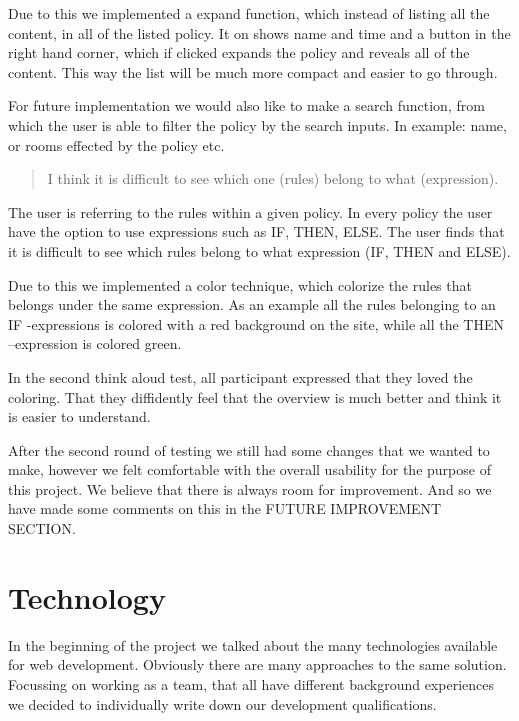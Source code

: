 Due to this we implemented a expand function, which instead of listing all the content, in all of the listed policy. It on shows name and time and a button in the right hand corner, which if clicked expands the policy and reveals all of the content. This way the list will be much more compact and easier to go through. 

For future implementation we would also like to make a search function, from which the user is able to filter the policy by the search inputs. In example: name, or rooms effected  by the policy etc.
 
\begin{quotation}
I think it is difficult to see which one (rules) belong to what (expression).
\end{quotation}

The user is referring to the rules within a given policy. In every policy the user have the option to use expressions such as IF, THEN, ELSE. The user finds that it is difficult to see which rules belong to what expression (IF, THEN and ELSE).

Due to this we implemented a color technique, which colorize the rules that belongs under the same expression. As an example all the rules belonging to an IF -expressions is colored with a red background on the site, while all the THEN –expression is colored green.

In the second think aloud test, all participant expressed that they loved the coloring. That they diffidently feel that the overview is much better and think it is easier to understand.


After the second round of testing we still had some changes that we wanted to make, however we felt comfortable with the overall usability for the purpose of this project. We believe that there is always room for improvement. And so we have made some comments on this in the FUTURE IMPROVEMENT SECTION.
 


\section{Technology}
In the beginning of the project we talked about the many technologies available for web development. Obviously there are many approaches to the same solution. Focussing on working as a team, that all have different background experiences we decided to individually write down our development qualifications.

